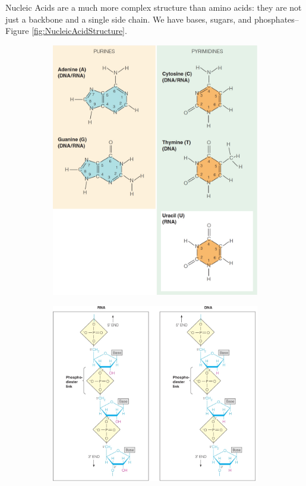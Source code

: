 \documentclass[]{article}
\begin{document}
Nucleic Acids are a much more complex structure than amino acids: they are not just a backbone and a single side chain. We have bases, sugars, and phosphates--Figure \ref{fig:NucleicAcidStructure}.
\begin{figure}[H]
	\centering
	\caption{DNA/RNA much larger than proteins} \label{fig:NucleicAcidStructure} 
	\begin{subfigure}{.5\textwidth}
		\centering
		\includegraphics[width=.9\linewidth]{NucleicAcidStructure1}
	\end{subfigure}%
	\begin{subfigure}{.5\textwidth}
		\centering
		\includegraphics[width=.9\linewidth]{NucleicAcidStructure2}
	\end{subfigure}
\end{figure}
\end{document}
